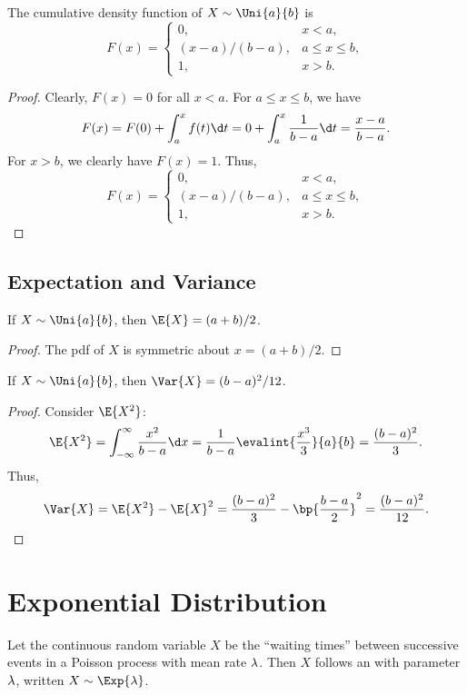 \begin{proposition}
    The cumulative density function of $X \sim \Uni{a}{b}$ is \[F(x) = \begin{cases}
        0, & x < a,\\
        (x-a)/(b-a), & a \leq x \leq b,\\
        1, & x > b.
    \end{cases}\]
\end{proposition}
\begin{proof}
    Clearly, $F(x) = 0$ for all $x < a$. For $a \leq x \leq b$, we have \[F(x) = F(0) + \int_a^x f(t) \d t = 0 + \int_a^x \frac1{b-a} \d t = \frac{x-a}{b-a}.\] For $x > b$, we clearly have $F(x) = 1$. Thus, \[F(x) = \begin{cases}
        0, & x < a,\\
        (x-a)/(b-a), & a \leq x \leq b,\\
        1, & x > b.
    \end{cases}\]
\end{proof}

\subsection{Expectation and Variance}

\begin{proposition}
    If $X \sim \Uni{a}{b}$, then $\E{X} = (a+b)/2$.
\end{proposition}
\begin{proof}
    The pdf of $X$ is symmetric about $x = (a+b)/2$.
\end{proof}

\begin{proposition}
    If $X \sim \Uni{a}{b}$, then $\Var{X} = (b-a)^2 / 12$.
\end{proposition}
\begin{proof}
    Consider $\E{X^2}$: \[\E{X^2} = \int_{-\infty}^\infty \frac{x^2}{b-a} \d x = \frac1{b-a} \evalint{\frac{x^3}{3}}{a}{b} = \frac{(b-a)^2}{3}.\] Thus, \[\Var{X} = \E{X^2} - \E{X}^2 = \frac{(b-a)^2}{3} - \bp{\frac{b-a}{2}}^2 = \frac{(b-a)^2}{12}.\]
\end{proof}

\section{Exponential Distribution}

\begin{definition}
    Let the continuous random variable $X$ be the ``waiting times'' between successive events in a Poisson process with mean rate $\lambda$. Then $X$ follows an  with parameter $\lambda$, written $X \sim \Exp{\l}$.
\end{definition}

